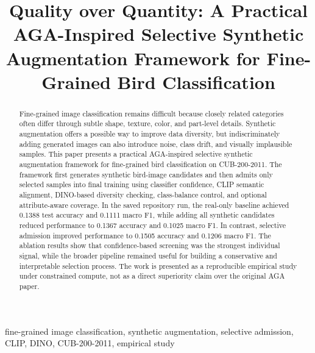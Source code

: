 \documentclass[conference]{IEEEtran}
\begin{document}
\title{Quality over Quantity: A Practical AGA-Inspired Selective Synthetic Augmentation Framework for Fine-Grained Bird Classification}

\author{
\and
{}
}

\maketitle

\begin{abstract}
Fine-grained image classification remains difficult because closely related categories often differ through subtle shape, texture, color, and part-level details. Synthetic augmentation offers a possible way to improve data diversity, but indiscriminately adding generated images can also introduce noise, class drift, and visually implausible samples. This paper presents a practical AGA-inspired selective synthetic augmentation framework for fine-grained bird classification on CUB-200-2011. The framework first generates synthetic bird-image candidates and then admits only selected samples into final training using classifier confidence, CLIP semantic alignment, DINO-based diversity checking, class-balance control, and optional attribute-aware coverage. In the saved repository run, the real-only baseline achieved 0.1388 test accuracy and 0.1111 macro F1, while adding all synthetic candidates reduced performance to 0.1367 accuracy and 0.1025 macro F1. In contrast, selective admission improved performance to 0.1505 accuracy and 0.1206 macro F1. The ablation results show that confidence-based screening was the strongest individual signal, while the broader pipeline remained useful for building a conservative and interpretable selection process. The work is presented as a reproducible empirical study under constrained compute, not as a direct superiority claim over the original AGA paper.
\end{abstract}

\begin{IEEEkeywords}
fine-grained image classification, synthetic augmentation, selective admission, CLIP, DINO, CUB-200-2011, empirical study
\end{IEEEkeywords}
\end{document}
